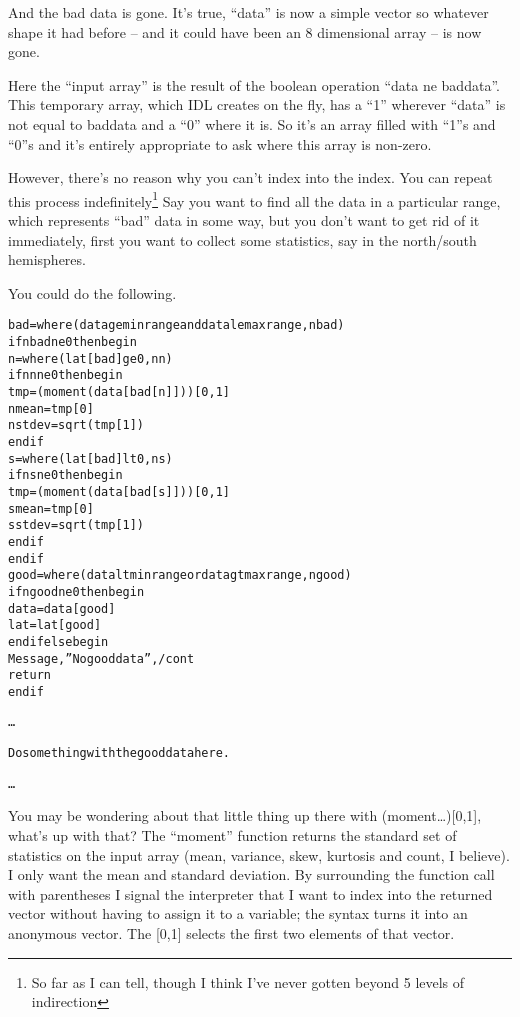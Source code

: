    

  And the bad data is gone. It's true, ``data'' is now a simple vector
  so whatever shape it had before -- and it could have been an 8
  dimensional array -- is now gone.

  Here the ``input array'' is the result of the boolean operation
  ``data ne baddata''. This temporary array, which IDL creates on the
  fly, has a ``1'' wherever ``data'' is not equal to baddata and a
  ``0'' where it is. So it's an array filled with ``1''s and ``0''s
  and it's entirely appropriate to ask where this array is non-zero.


  However, there's no reason why you can't index into the index. You
  can repeat this process indefinitely\footnote{So far as I can tell,
  though I think I've never gotten beyond 5 levels of indirection} Say
  you want to find all the data in a particular range, which
  represents ``bad'' data in some way, but you don't want to get rid
  of it immediately, first you want to collect some statistics, say in
  the north/south hemispheres. 


You could do the following.

\newpage

\begin{alltt}
  bad=where(data ge minrange and data le maxrange, nbad)
  if nbad ne 0 then begin 
    n = where(lat[bad] ge 0, nn)
    if nn ne 0 then begin 
      tmp = (moment(data[bad[n]]))[0,1]
      nmean = tmp[0]
      nstdev =sqrt(tmp[1])
    endif 
    s = where(lat[bad] lt 0,ns)  
    if ns ne 0 then begin 
      tmp = (moment(data[bad[s]]))[0,1]
      smean  = tmp[0]
      sstdev = sqrt(tmp[1])
    endif 
  endif 
  good=where(data lt minrange or data gt maxrange,ngood)
  if ngood ne 0 then begin 
    data=data[good] 
    lat=lat[good]
  endif else begin 
    Message,''No good data'',/cont
    return
  endif 

  \ldots

   Do something with the good data here.

   \ldots

\end{alltt}\index{}

  You may be wondering about that little thing up there with
  (moment\ldots)[0,1], what's up with that? The ``moment'' function
  returns the standard set of statistics on the input array (mean,
  variance, skew, kurtosis and count, I believe). I only want the mean
  and standard deviation. By surrounding the function call with
  parentheses I signal the interpreter that I want to index into the
  returned vector without having to assign it to a variable; the syntax
  turns it into an anonymous vector. The [0,1] selects the first two
  elements of that vector.

